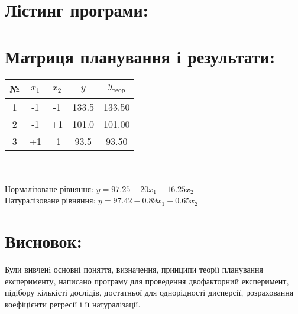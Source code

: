 \documentclass{article}
\begin{document}
    \section*{Лістинг програми:}
    \texttt{\small }

    \section*{Матриця планування і результати:}

    \begin{tabular} {|c|c|c|c|c|}
        \hline
        № & $\overline{x_1}$ & $\overline{x_2}$ & $\overline{y}$ & $y_{теор}$ \\ \hline
        1 &               -1 &               -1 &          133.5 &     133.50 \\ \hline
        2 &               -1 &               +1 &          101.0 &     101.00 \\ \hline
        3 &               +1 &               -1 &           93.5 &      93.50 \\ \hline
    \end{tabular}
    \\\\
    Нормалізоване рівняння: $y = 97.25 - 20x_1 - 16.25x_2$ \\
    Натуралізоване рівняння: $y = 97.42 - 0.89x_1 - 0.65x_2$
    \section*{Висновок:}
    Були вивченi основні поняття, визначення, принципи теорії планування експерименту, написано програму для проведення двофакторний експеримент, підібору кількісті дослідів, достатньої для однорідності дисперсії, розраховання коефіцієнти регресії і її натуралізації.
\end{document}
